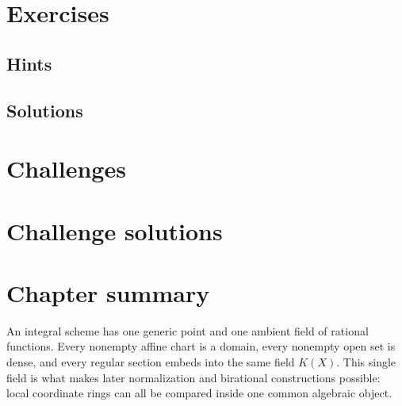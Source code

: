 \section{Exercises}


\ifdefined\IncludeExerciseHints
\subsection*{Hints}

\fi

\ifdefined\IncludeExerciseSolutions
\subsection*{Solutions}

\fi

\section{Challenges}






\ifdefined\IncludeChallengeSolutions
\section{Challenge solutions}

\fi

\section{Chapter summary}
An integral scheme has one generic point and one ambient field of rational functions.  Every nonempty affine chart
is a domain, every nonempty open set is dense, and every regular section embeds into the same field $K(X)$.  This
single field is what makes later normalization and birational constructions possible: local coordinate rings can
all be compared inside one common algebraic object.



